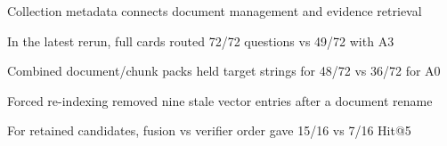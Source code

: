 \begin{highlights}
\item Collection metadata connects document management and evidence retrieval
\item In the latest rerun, full cards routed 72/72 questions vs 49/72 with A3
\item Combined document/chunk packs held target strings for 48/72 vs 36/72 for A0
\item Forced re-indexing removed nine stale vector entries after a document rename
\item For retained candidates, fusion vs verifier order gave 15/16 vs 7/16 Hit@5
\end{highlights}
